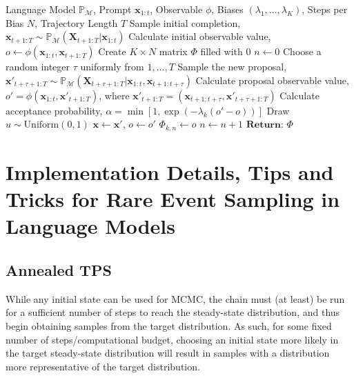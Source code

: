 \documentclass{article}
\newcommand{\realtraj}{\mathbf{x}}
\newcommand{\unrealtraj}{\mathbf{X}}
\newcommand{\obs}{\phi}
\newcommand{\Prob}{\mathbb{P}}
\newcommand{\probmodel}{\Prob_{\mathcal{M}}}
\begin{document}
\begin{algorithm}[h]
    \caption{Annealed Transition Path Sampling for Language Modelling}\label{alg:tps}
    \begin{algorithmic}
        \REQUIRE Language Model $\probmodel$, Prompt $\realtraj_{1:t}$, Observable $\obs$, Biases $(\lambda_1, \dots, \lambda_K)$, Steps per Bias $N$, Trajectory Length $T$
        \STATE Sample initial completion, $\realtraj_{t+1:T} \sim \probmodel( \unrealtraj_{t+1:T} | \realtraj_{1:t})$
        \STATE Calculate initial observable value, $o \gets \obs(\realtraj_{1:t}, \realtraj_{t+1:T})$
        \STATE Create $K \times N$ matrix $\Phi$ filled with $0$
        \STATE $n \gets 0$
        \STATE Choose a random integer $\tau$ uniformly from $1, \dots ,T$
        \STATE Sample the new proposal, $\realtraj'_{t+\tau+1:T} \sim \probmodel( \unrealtraj_{t+\tau+1:T} | \realtraj_{1:t}, \realtraj_{t+1:t + \tau})$
        \STATE Calculate proposal observable value, $o' = \phi(\realtraj_{1:t}, \realtraj'_{t+1:T})$, where $\realtraj'_{t+1:T} = (\realtraj_{t+1:t+\tau}, \realtraj'_{t+\tau+1:T})$
        \STATE Calculate acceptance probability, $\alpha = \min \left[1, \exp(-\lambda_k (o' - o)) \right]$
        \STATE Draw $u \sim \text{Uniform}(0, 1)$
        \STATE $\realtraj \gets \realtraj'$, $o \gets o'$
        \ENDIF
        \STATE $\Phi_{k, n} \gets o$
        \STATE $n \gets n + 1$
        \ENDWHILE
        \ENDFOR
        \STATE $\textbf{Return: } \Phi$
    \end{algorithmic}
\end{algorithm}

\section{Implementation Details, Tips and Tricks for Rare Event Sampling in Language Models}

\subsection{Annealed TPS}

While any initial state can be used for MCMC, the chain must (at least) be run for a sufficient number of steps to reach the steady-state distribution, and thus begin
obtaining samples from the target distribution. As such, for some fixed number of steps/computational budget, choosing an initial state more likely in the target steady-state distribution will
result in samples with a distribution more representative of the target distribution.
\end{document}
